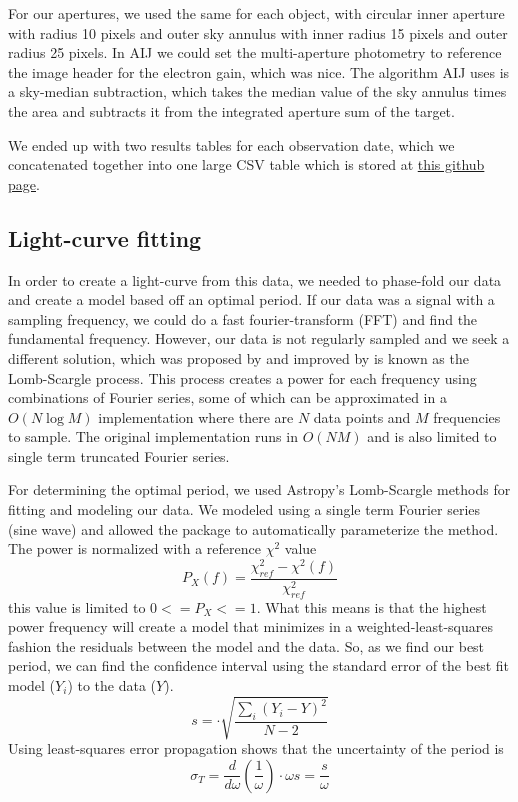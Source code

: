 \documentclass[%
aip,
jmp,
reprint,
floatfix,
nofootinbib
]{revtex4-1}
\begin{document}
	For our apertures, we used the same for each object, with circular inner aperture with radius 10 pixels and outer sky annulus with inner radius 15 pixels and outer radius 25 pixels. In AIJ we could set the multi-aperture photometry to reference the image header for the electron gain, which was nice. The algorithm AIJ uses is a sky-median subtraction, which takes the median value of the sky annulus times the area and subtracts it from the integrated aperture sum of the target.

	We ended up with two results tables for each observation date, which we concatenated together into one large CSV table which is stored at \href{https://github.com/mileslucas/astro344l/blob/master/project/data/full_data.csv}{this github page}.
	
	\subsection{Light-curve fitting}
	
	In order to create a light-curve from this data, we needed to phase-fold our data and create a model based off an optimal period. If our data was a signal with a sampling frequency, we could do a fast fourier-transform (FFT) and find the fundamental frequency. However, our data is not regularly sampled and we seek a different solution, which was proposed by \citet{1976Ap&SS..39..447L} and improved by \citet{1982ApJ...263..835S} is known as the Lomb-Scargle process. This process creates a power for each frequency using combinations of Fourier series, some of which can be approximated in a $O(N \log{M})$ implementation \citep{1989ApJ...338..277P} where there are $N$ data points and $M$ frequencies to sample. The original implementation runs in $O(N M)$ and is also limited to single term truncated Fourier series.	
	
	For determining the optimal period, we used Astropy's Lomb-Scargle methods for fitting and modeling our data. We modeled using a single term Fourier series (sine wave) and allowed the package to automatically parameterize the method. The power is normalized with a reference $\chi^2$ value 
	\begin{equation}
	P_X(f) = \frac{\chi^2_{ref} - \chi^2(f)}{\chi^2_{ref}}
	\end{equation}
	this value is limited to $0<=P_X<=1$. What this means is that the highest power frequency will create a model that minimizes in a weighted-least-squares fashion the residuals between the model and the data. So, as we find our best period, we can find the confidence interval using the standard error of the best fit model ($Y_i$) to the data ($Y$).
	\begin{equation}
	s = \cdot\sqrt{\frac{\sum_i{(Y_i-Y)^2}}{N-2}}
	\end{equation}
	Using least-squares error propagation shows that the uncertainty of the period is
	\begin{equation}
	\sigma_T = \frac{d}{d \omega}(\frac{1}{\omega})\cdot \omega s = \frac{s}{\omega}
	\end{equation}
	
\end{document}
